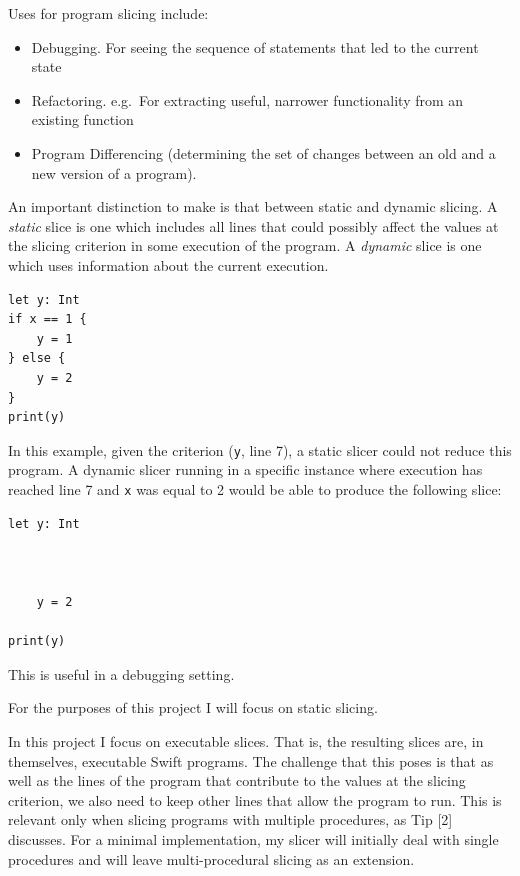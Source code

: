 Uses for program slicing include:

\begin{itemize}
\tightlist
\item
  Debugging. For seeing the sequence of statements that led to the
  current state
\item
  Refactoring. e.g.~For extracting useful, narrower functionality from
  an existing function
\item
  Program Differencing (determining the set of changes between an old
  and a new version of a program).
\end{itemize}

An important distinction to make is that between static and dynamic
slicing. A \emph{static} slice is one which includes all lines that
could possibly affect the values at the slicing criterion in some
execution of the program. A \emph{dynamic} slice is one which uses
information about the current execution.

\begin{verbatim}
let y: Int
if x == 1 {
    y = 1
} else {
    y = 2
}
print(y)
\end{verbatim}

In this example, given the criterion (\texttt{y}, line 7), a static
slicer could not reduce this program. A dynamic slicer running in a
specific instance where execution has reached line 7 and \texttt{x} was
equal to 2 would be able to produce the following slice:

\begin{verbatim}
let y: Int



    y = 2

print(y)
\end{verbatim}

This is useful in a debugging setting.

For the purposes of this project I will focus on static slicing.

In this project I focus on executable slices. That is, the resulting
slices are, in themselves, executable Swift programs. The challenge that
this poses is that as well as the lines of the program that contribute
to the values at the slicing criterion, we also need to keep other lines
that allow the program to run. This is relevant only when slicing
programs with multiple procedures, as Tip {[}2{]} discusses. For a
minimal implementation, my slicer will initially deal with single
procedures and will leave multi-procedural slicing as an extension.

